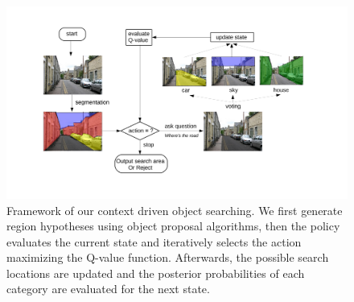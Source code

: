 \begin{figure}[htb]
\begin{center}
\includegraphics[width=\linewidth]{figures/flowchart_Q.pdf}
\caption{Framework of our context driven object searching. We first generate region hypotheses using object proposal algorithms, then the policy evaluates the current state and iteratively selects the action maximizing the Q-value function. Afterwards, the possible search locations are updated and the posterior probabilities of each category are evaluated for the next state.}
\label{fig:flowchart}
\end{center}

\end{figure}

